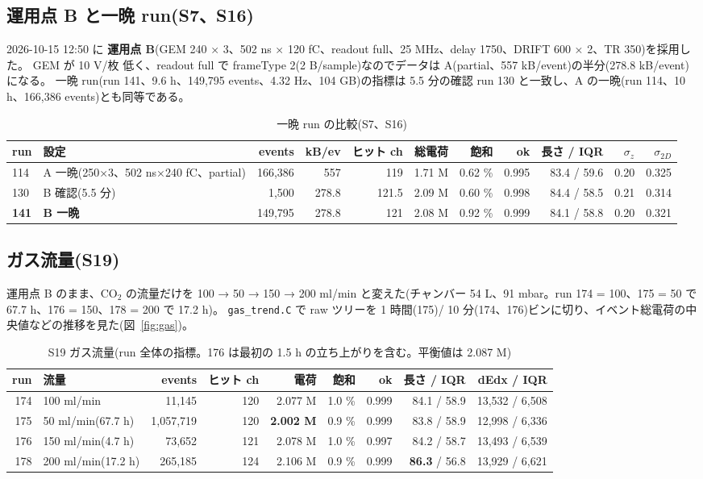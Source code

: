 \documentclass[a4paper,11pt]{ltjsarticle}
\begin{document}
\subsection{運用点 B と一晩 run(S7、S16)}
2026-10-15 12:50 に \textbf{運用点 B}(GEM 240 × 3、502 ns × 120 fC、readout full、25 MHz、delay 1750、DRIFT 600 × 2、TR 350)を採用した。
GEM が 10 V/枚 低く、readout full で frameType 2(2 B/sample)なのでデータは A(partial、557 kB/event)の半分(278.8 kB/event)になる。
一晩 run(run 141、9.6 h、149,795 events、4.32 Hz、104 GB)の指標は 5.5 分の確認 run 130 と一致し、A の一晩(run 114、10 h、166,386 events)とも同等である。

\begin{table}[H]\centering\small
\caption{一晩 run の比較(S7、S16)}
\scriptsize\setlength{\tabcolsep}{3pt}
\begin{tabular}{llrrrrrrrrr}
\toprule
run & 設定 & events & kB/ev & ヒット ch & 総電荷 & 飽和 & ok & 長さ / IQR & $\sigma_z$ & $\sigma_{2D}$ \\
\midrule
114 & A 一晩(250×3、502 ns×240 fC、partial) & 166,386 & 557 & 119 & 1.71 M & 0.62 \% & 0.995 & 83.4 / 59.6 & 0.20 & 0.325 \\
130 & B 確認(5.5 分) & 1,500 & 278.8 & 121.5 & 2.09 M & 0.60 \% & 0.998 & 84.4 / 58.5 & 0.21 & 0.314 \\
\textbf{141} & \textbf{B 一晩} & 149,795 & 278.8 & 121 & 2.08 M & 0.92 \% & 0.999 & 84.1 / 58.8 & 0.20 & 0.321 \\
\bottomrule
\end{tabular}
\end{table}

\subsection{ガス流量(S19)}
運用点 B のまま、CO$_2$ の流量だけを 100 → 50 → 150 → 200 ml/min と変えた(チャンバー 54 L、91 mbar。run 174 = 100、175 = 50 で 67.7 h、176 = 150、178 = 200 で 17.2 h)。
\texttt{gas\_trend.C} で raw ツリーを 1 時間(175)/ 10 分(174、176)ビンに切り、イベント総電荷の中央値などの推移を見た(図~\ref{fig:gas})。

\begin{table}[H]\centering\small
\caption{S19 ガス流量(run 全体の指標。176 は最初の 1.5 h の立ち上がりを含む。平衡値は 2.087 M)}
\begin{tabular}{rlrrrrrrr}
\toprule
run & 流量 & events & ヒット ch & 電荷 & 飽和 & ok & 長さ / IQR & dEdx / IQR \\
\midrule
174 & 100 ml/min & 11,145 & 120 & 2.077 M & 1.0 \% & 0.999 & 84.1 / 58.9 & 13,532 / 6,508 \\
175 & 50 ml/min(67.7 h) & 1,057,719 & 120 & \textbf{2.002 M} & 0.9 \% & 0.999 & 83.8 / 58.9 & 12,998 / 6,336 \\
176 & 150 ml/min(4.7 h) & 73,652 & 121 & 2.078 M & 1.0 \% & 0.997 & 84.2 / 58.7 & 13,493 / 6,539 \\
178 & 200 ml/min(17.2 h) & 265,185 & 124 & 2.106 M & 0.9 \% & 0.999 & \textbf{86.3} / 56.8 & 13,929 / 6,621 \\
\bottomrule
\end{tabular}
\end{table}
\end{document}
